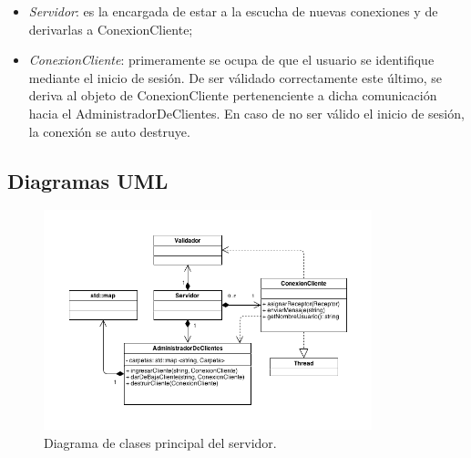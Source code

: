 \documentclass{article}
\begin{document}
	\begin{itemize}
	\itemsep=5pt \topsep=0pt \partopsep=0pt \parskip=0pt \parsep=0pt

		\item \textit{Servidor}: es la encargada de estar a la escucha de nuevas conexiones y de derivarlas a ConexionCliente;

		\item \textit{ConexionCliente}: primeramente se ocupa de que el usuario se identifique mediante el inicio de sesión. De ser válidado correctamente este último, se deriva al objeto de ConexionCliente pertenenciente a dicha comunicación hacia el AdministradorDeClientes. En caso de no ser válido el inicio de sesión, la conexión se auto destruye.

	\end{itemize}
\bigskip



\subsection{Diagramas UML}

	
	
\begin{figure}[h]
	\centering
	\includegraphics[width=0.85\textwidth]{images/Diagrama-modelo-servidor-parte1.png}
	\caption{Diagrama de clases principal del servidor.}
\end{figure}
\bigskip

\newpage
\end{document}
